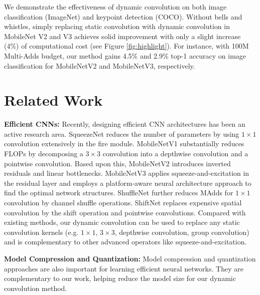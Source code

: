 \documentclass[10pt,twocolumn,letterpaper]{article}
\begin{document}
We demonstrate the effectiveness of dynamic convolution on both image classification (ImageNet) and keypoint detection (COCO). Without bells and whistles, simply replacing static convolution with dynamic convolution in MobileNet V2 and V3 achieves solid improvement with only a slight increase (4\%) of computational cost (see Figure \ref{fig:highlight}). For instance, with 100M Multi-Adds budget, our method gains 4.5\% and 2.9\% top-1 accuracy on image classification for MobileNetV2 and MobileNetV3, respectively.

 
\section{Related Work}
\noindent \textbf{Efficient CNNs:} Recently, designing efficient CNN architectures \cite{squeezenet16, howard2017mobilenets, sandler2018mobilenetv2, howard2019mbnetv3, Zhang_2018_CVPR, Ma_2018_ECCV} has been an active research area. SqueezeNet \cite{squeezenet16} reduces the number of parameters by using $1\times1$ convolution extensively in the fire module. MobileNetV1 \cite{howard2017mobilenets} substantially reduces FLOPs by decomposing a $3\times3$ convolution into a depthwise convolution and a pointwise convolution. Based upon this, MobileNetV2 \cite{sandler2018mobilenetv2} introduces inverted residuals and linear bottlenecks. MobileNetV3 \cite{howard2019mbnetv3} applies squeeze-and-excitation \cite{Hu_2018_CVPR} in the residual layer and employs a platform-aware neural architecture approach \cite{Tan_2019_CVPR} to find the optimal network structures. ShuffleNet further reduces MAdds for $1\times1$ convolution by channel shuffle operations. ShiftNet \cite{shift} replaces expensive spatial convolution by the shift operation and pointwise convolutions. 
Compared with existing methods, our dynamic convolution can be used to replace any static convolution kernels (e.g. $1\times1$, $3\times3$, depthwise convolution, group convolution) and is complementary to other advanced operators like squeeze-and-excitation.

\noindent \textbf{Model Compression and Quantization:} Model compression \cite{Han2016deepcompression, Liu_2017_ICCV, He_2018_ECCV} and quantization \cite{NIPS2015BinaryConnect, zhu2017trained, Zhang_2018_ECCV, Yang_2019_CVPR, Wang_2019_CVPR} approaches are also important for learning efficient neural networks. They are complementary to our work, helping reduce the model size for our dynamic convolution method. 
\end{document}
